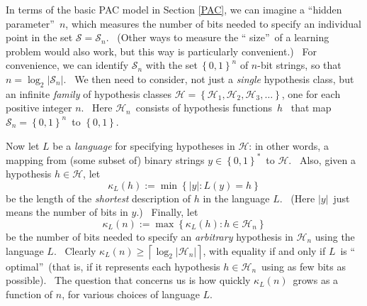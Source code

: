 \documentclass[11pt,onecolumn]{article}%
\begin{document}
In terms of the basic PAC model in Section \ref{PAC}, we can imagine a
\textquotedblleft hidden parameter\textquotedblright\ $n$, which measures the
number of bits needed to specify an individual point in the set $\mathcal{S}%
=\mathcal{S}_{n}$. \ (Other ways to measure the \textquotedblleft
size\textquotedblright\ of a learning problem would also work, but this way is
particularly convenient.) \ For convenience, we can identify $\mathcal{S}_{n}$
with the set$\ \left\{  0,1\right\}  ^{n}$ of $n$-bit strings, so that
$n=\log_{2}\left\vert \mathcal{S}_{n}\right\vert $. \ We then need to
consider, not just a \textit{single} hypothesis class, but an infinite
\textit{family} of hypothesis classes $\mathcal{H}=\left\{  \mathcal{H}%
_{1},\mathcal{H}_{2},\mathcal{H}_{3},\ldots\right\}  $, one for each positive
integer $n$. \ Here $\mathcal{H}_{n}$\ consists of hypothesis functions\ $h$%
\ that map $\mathcal{S}_{n}=\left\{  0,1\right\}  ^{n}$\ to $\left\{
0,1\right\}  $.

Now let $L$ be a \textit{language} for specifying hypotheses in $\mathcal{H}$:
in other words, a mapping from (some subset of) binary strings $y\in\left\{
0,1\right\}  ^{\ast}$\ to $\mathcal{H}$. \ Also, given a hypothesis
$h\in\mathcal{H}$, let%
\[
\kappa_{L}\left(  h\right)  :=\min\left\{  \left\vert y\right\vert :L\left(
y\right)  =h\right\}
\]
be the length of the \textit{shortest} description of $h$ in the language $L$.
\ (Here $\left\vert y\right\vert $\ just means the number of bits in $y$.)
\ Finally, let%
\[
\kappa_{L}\left(  n\right)  :=\max\left\{  \kappa_{L}\left(  h\right)
:h\in\mathcal{H}_{n}\right\}
\]
be the number of bits needed to specify an \textit{arbitrary} hypothesis in
$\mathcal{H}_{n}$ using the language $L$. \ Clearly $\kappa_{L}\left(
n\right)  \geq\left\lceil \log_{2}\left\vert \mathcal{H}_{n}\right\vert
\right\rceil $, with equality if and only if $L$\ is \textquotedblleft
optimal\textquotedblright\ (that is, if it represents each hypothesis
$h\in\mathcal{H}_{n}$\ using as few bits as possible). \ The question that
concerns us is how quickly $\kappa_{L}\left(  n\right)  $\ grows as a function
of $n$, for various choices of language $L$.
\end{document}
